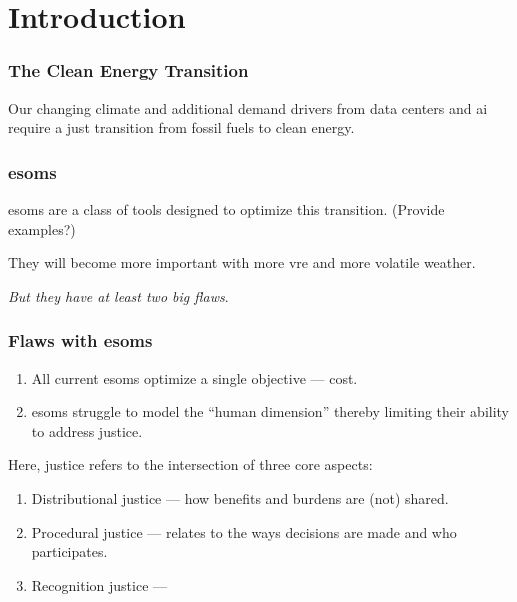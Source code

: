 \section{Introduction}

\begin{frame}
    \frametitle{The Clean Energy Transition}
    Our changing climate and additional demand drivers from data 
    centers and \gls{ai} require a just transition from fossil 
    fuels to clean energy.
\end{frame}

\begin{frame}
    \frametitle{\glspl{esom}}
    \Glspl{esom} are a class of tools designed to 
    optimize this transition. (Provide examples?)

    They will become more important with more \gls{vre}
    and more volatile weather.

    \textit{But they have at least two big flaws}.
\end{frame}

\begin{frame}
    \frametitle{Flaws with \glspl{esom}}

    \begin{enumerate}
        \item All current \glspl{esom} optimize a single objective --- cost.
        \item \glspl{esom} struggle to model the ``human dimension'' thereby
        limiting their ability to address justice.

    \end{enumerate}
    Here, justice refers to the intersection of three core aspects:
    \begin{enumerate}
        \item Distributional justice --- how benefits and burdens are (not) shared.
        \item Procedural justice --- relates to the ways decisions are made and who participates.
        \item Recognition justice --- 
    \end{enumerate}
\end{frame}